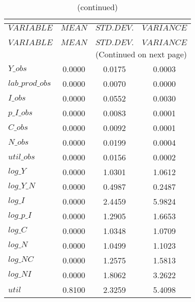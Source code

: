  
\begin{center}
\begin{longtable}{lccc} 
\caption{THEORETICAL MOMENTS}\\
 \label{Table:th_moments}\\
\toprule 
$VARIABLE        $	 & 	 $         MEAN$	 & 	 $    STD. DEV.$	 & 	 $     VARIANCE$\\
\midrule \endfirsthead 
\caption{(continued)}\\
 \toprule \\ 
$VARIABLE        $	 & 	 $         MEAN$	 & 	 $    STD. DEV.$	 & 	 $     VARIANCE$\\
\midrule \endhead 
\midrule \multicolumn{4}{r}{(Continued on next page)} \\ \bottomrule \endfoot 
\bottomrule \endlastfoot 
$Y\_obs          $	 & 	       0.0000	 & 	       0.0175	 & 	       0.0003 \\ 
$lab\_prod\_obs  $	 & 	       0.0000	 & 	       0.0070	 & 	       0.0000 \\ 
$I\_obs          $	 & 	       0.0000	 & 	       0.0552	 & 	       0.0030 \\ 
$p\_I\_obs       $	 & 	       0.0000	 & 	       0.0083	 & 	       0.0001 \\ 
$C\_obs          $	 & 	       0.0000	 & 	       0.0092	 & 	       0.0001 \\ 
$N\_obs          $	 & 	       0.0000	 & 	       0.0199	 & 	       0.0004 \\ 
$util\_obs       $	 & 	       0.0000	 & 	       0.0156	 & 	       0.0002 \\ 
$log\_Y          $	 & 	       0.0000	 & 	       1.0301	 & 	       1.0612 \\ 
$log\_Y\_N       $	 & 	       0.0000	 & 	       0.4987	 & 	       0.2487 \\ 
$log\_I          $	 & 	       0.0000	 & 	       2.4459	 & 	       5.9824 \\ 
$log\_p\_I       $	 & 	       0.0000	 & 	       1.2905	 & 	       1.6653 \\ 
$log\_C          $	 & 	       0.0000	 & 	       1.0348	 & 	       1.0709 \\ 
$log\_N          $	 & 	       0.0000	 & 	       1.0499	 & 	       1.1023 \\ 
$log\_NC         $	 & 	       0.0000	 & 	       1.2575	 & 	       1.5813 \\ 
$log\_NI         $	 & 	       0.0000	 & 	       1.8062	 & 	       3.2622 \\ 
${util}          $	 & 	       0.8100	 & 	       2.3259	 & 	       5.4098 \\ 
\end{longtable}
 \end{center}
